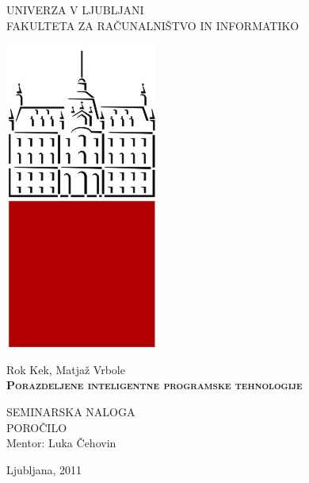 \documentclass[12pt,a4paper,openany]{book}
\begin{document}
\thispagestyle{empty} 

\begin{center}
{\large 
UNIVERZA V LJUBLJANI\\
FAKULTETA ZA RAČUNALNIŠTVO IN INFORMATIKO\\
}

 \includegraphics[scale=0.2,keepaspectratio=true]{./pictures/uni_logo.png}


\vspace{1.5cm}
{\LARGE Rok Kek, Matjaž Vrbole}\\

\vspace{2cm}
\textsc{\textbf{\LARGE 
Porazdeljene inteligentne programske tehnologije
}}

\vspace{2cm}
{ SEMINARSKA NALOGA}\\
{ POROČILO }\\

\vspace{2cm} 
{\Large Mentor: Luka Čehovin}

\vfill
{\Large Ljubljana, 2011}
\end{center}

\newpage


\renewcommand\thepage{} 
\tableofcontents 
\renewcommand\thepage{\arabic{page}}

\thispagestyle{empty}




\setcounter{page}{1}
\end{document}
